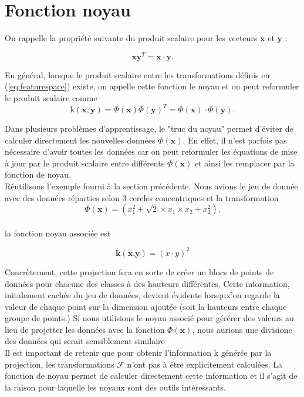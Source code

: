 \section{Fonction noyau}\label{sec:kernel}

On rappelle la propriété suivante du produit scalaire pour les vecteurs $\textbf{x}$ et $\textbf{y}$ : 

$$\textbf{x}\textbf{y}^T = \textbf{x} \cdot \textbf{y}.$$

En général, lorsque le produit scalaire entre les transformations définis en (\ref{eq:featurespace}) existe, on appelle cette fonction le noyau et on peut reformuler le produit scalaire comme
$$\textrm{k}(\textbf{x}, \textbf{y}) = \Phi(\textbf{x})\Phi(\textbf{y})^T = \Phi(\textbf{x})\cdot \Phi(\textbf{y}).$$

Dans plusieurs problèmes d'apprentissage, le "truc du noyau" permet d'éviter de calculer directement les nouvelles données $\Phi(\textbf{x})$. 
En effet, il n'est parfois pas nécessaire d'avoir toutes les données car on peut reformuler les équations de mise à jour par le produit scalaire 
entre différents $\Phi(\textbf{x})$ et ainsi les remplacer par la fonction de noyau. \\

Réutilisons l'exemple fourni à la section précédente. Nous avions le jeu de donnée avec des données réparties selon 3 cercles concentriques 
et la transformation $$\Phi(\textbf{x})= (x_1^2 + \sqrt{2} \times x_1\times x_2 + x_2^2).$$ \\ la fonction noyau associée est

$$\textbf{k}(\textbf{x,y})= (x \cdot y)^2$$

Concrètement, cette projection fera en sorte de créer un blocs de points de données pour chacune des classes à des hauteurs différentes. Cette information, 
initalement cachée du jeu de données, devient évidente lorsqux'on regarde la valeur de chaque point sur la dimension ajoutée (soit la hauteurs entre chaque groupe de points.)
Si nous utilisions le noyau associé pour gérérer des valeurs au lieu de projetter les données avec la fonction $\Phi(\textbf{x})$,
nous aurions une divisione des données qui serait sensiblement similaire \\ 

Il est important de retenir que pour obtenir l’information $\textrm{k}$ générée par la projection, les transformations $\mathcal{F}$ n'ont pas à être explicitement calculées. 
La fonction de noyau permet de calculer directement cette information et il s’agit de la raison pour laquelle les noyaux sont des outils intéressants. \\

